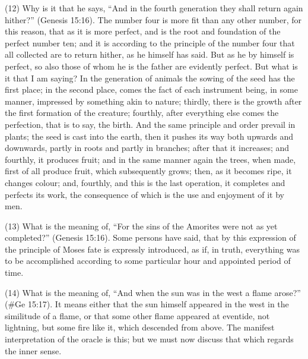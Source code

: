 (12) Why is it that he says, ``And in the fourth generation they shall return again hither?'' (Genesis
15:16). The number four is more fit than any other number, for this reason, that as it is more
perfect, and is the root and foundation of the perfect number ten; and it is according to the principle
of the number four that all collected are to return hither, as he himself has said. But as he by
himself is perfect, so also those of whom he is the father are evidently perfect. But what is it that I
am saying? In the generation of animals the sowing of the seed has the first place; in the second
place, comes the fact of each instrument being, in some manner, impressed by something akin to
nature; thirdly, there is the growth after the first formation of the creature; fourthly, after everything
else comes the perfection, that is to say, the birth. And the same principle and order prevail in
plants; the seed is cast into the earth, then it pushes its way both upwards and downwards, partly in
roots and partly in branches; after that it increases; and fourthly, it produces fruit; and in the same
manner again the trees, when made, first of all produce fruit, which subsequently grows; then, as it
becomes ripe, it changes colour; and, fourthly, and this is the last operation, it completes and
perfects its work, the consequence of which is the use and enjoyment of it by men.

(13) What is the meaning of, ``For the sins of the Amorites were not as yet completed?'' (Genesis
15:16). Some persons have said, that by this expression of the principle of Moses fate is
expressly introduced, as if, in truth, everything was to be accomplished according to some
particular hour and appointed period of time.

(14) What is the meaning of, ``And when the sun was in the west a flame arose?'' (\#Ge 15:17).
It means either that the sun himself appeared in the west in the similitude of a flame, or that some
other flame appeared at eventide, not lightning, but some fire like it, which descended from above.
The manifest interpretation of the oracle is this; but we must now discuss that which regards the
inner sense.

